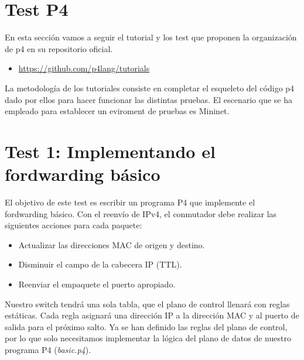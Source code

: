 \section{Test P4}
En esta sección vamos a seguir el tutorial y los test que proponen la organización de p4 en su repositorio oficial.
\begin{itemize}
    \item \url{https://github.com/p4lang/tutorials}
\end{itemize}
La metodología de los tutoriales consiste en completar el esqueleto del código p4 dado por ellos para hacer funcionar las distintas pruebas. El escenario que se ha empleado para establecer un eviroment de pruebas es Mininet.

\section{Test 1: Implementando el fordwarding básico}

El objetivo de este test es escribir un programa P4 que implemente el fordwarding básico. Con el reenvío de IPv4, el conmutador debe realizar las siguientes acciones para cada paquete:
\begin{itemize}
    \item Actualizar las direcciones MAC de origen y destino.
    \item Disminuir el campo de la cabecera IP (TTL).
    \item Reenviar el empaquete el puerto apropiado.
\end{itemize}

Nuestro switch tendrá una sola tabla, que el plano de control llenará con reglas estáticas. Cada regla asignará una dirección IP a la dirección MAC y al puerto de salida para el próximo salto. Ya se han definido las reglas del plano de control, por lo que solo necesitamos implementar la lógica del plano de datos de nuestro programa P4 (\textit{basic.p4}).

